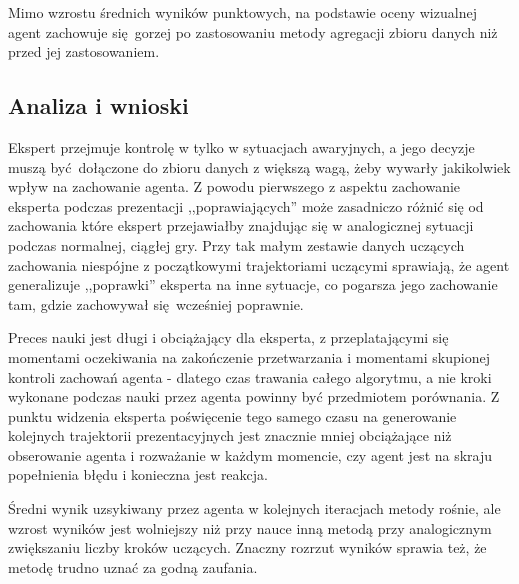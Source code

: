 Mimo wzrostu średnich wyników punktowych, na podstawie oceny wizualnej agent zachowuje się gorzej po zastosowaniu metody agregacji zbioru danych niż przed jej zastosowaniem.

\subsection {Analiza i wnioski}

Ekspert przejmuje kontrolę w tylko w sytuacjach awaryjnych, a jego decyzje muszą być dołączone do zbioru danych z większą wagą, żeby wywarły jakikolwiek wpływ na zachowanie agenta. Z powodu pierwszego z aspektu zachowanie eksperta podczas prezentacji ,,poprawiających'' może zasadniczo różnić się od zachowania które ekspert przejawiałby znajdując się w analogicznej sytuacji podczas normalnej, ciągłej gry. Przy tak małym zestawie danych uczących zachowania niespójne z początkowymi trajektoriami uczącymi sprawiają, że agent generalizuje ,,poprawki'' eksperta na inne sytuacje, co pogarsza jego zachowanie tam, gdzie zachowywał się wcześniej poprawnie.

Preces nauki jest długi i obciążający dla eksperta, z przeplatającymi się momentami oczekiwania na zakończenie przetwarzania i momentami skupionej kontroli zachowań agenta - dlatego czas trawania całego algorytmu, a nie kroki wykonane podczas nauki przez agenta powinny być przedmiotem porównania. Z punktu widzenia eksperta poświęcenie tego samego czasu na generowanie kolejnych trajektorii prezentacyjnych jest znacznie mniej obciążające niż obserowanie agenta i rozważanie w każdym momencie, czy agent jest na skraju popełnienia błędu i konieczna jest reakcja.

Średni wynik uzsykiwany przez agenta w kolejnych iteracjach metody rośnie, ale wzrost wyników jest wolniejszy niż przy nauce inną metodą przy analogicznym zwiększaniu liczby kroków uczących. Znaczny rozrzut wyników sprawia też, że metodę trudno uznać za godną zaufania.
